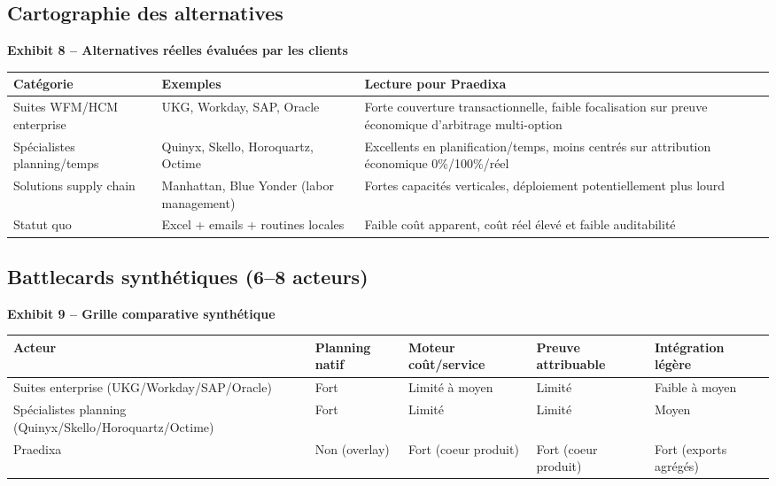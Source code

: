 \documentclass[11pt,a4paper]{article}
\newcommand{\exhibit}[1]{\vspace{2mm}\noindent\colorbox{PraedixaLight}{\parbox{\dimexpr\linewidth-2\fboxsep\relax}{\textbf{#1}}}\vspace{1mm}}
\begin{document}
\subsection{Cartographie des alternatives}
\exhibit{Exhibit 8 -- Alternatives réelles évaluées par les clients}
\begin{tabularx}{\linewidth}{@{}l l X@{}}
\toprule
\textbf{Catégorie} & \textbf{Exemples} & \textbf{Lecture pour Praedixa} \\
\midrule
Suites WFM/HCM enterprise & UKG, Workday, SAP, Oracle & Forte couverture transactionnelle, faible focalisation sur preuve économique d'arbitrage multi-option \\
Spécialistes planning/temps & Quinyx, Skello, Horoquartz, Octime & Excellents en planification/temps, moins centrés sur attribution économique 0\%/100\%/réel \\
Solutions supply chain & Manhattan, Blue Yonder (labor management) & Fortes capacités verticales, déploiement potentiellement plus lourd \\
Statut quo & Excel + emails + routines locales & Faible coût apparent, coût réel élevé et faible auditabilité \\
\bottomrule
\end{tabularx}

\subsection{Battlecards synthétiques (6--8 acteurs)}
\exhibit{Exhibit 9 -- Grille comparative synthétique}
\begin{tabularx}{\linewidth}{@{}Y >{\centering\arraybackslash}p{2.2cm} >{\centering\arraybackslash}p{2.2cm} >{\centering\arraybackslash}p{2.2cm} >{\centering\arraybackslash}p{2.2cm}@{}}
\toprule
\textbf{Acteur} & \textbf{Planning natif} & \textbf{Moteur coût/service} & \textbf{Preuve attribuable} & \textbf{Intégration légère} \\
\midrule
Suites enterprise (UKG/Workday/SAP/Oracle) & Fort & Limité à moyen & Limité & Faible à moyen \\
Spécialistes planning (Quinyx/Skello/Horoquartz/Octime) & Fort & Limité & Limité & Moyen \\
Praedixa & Non (overlay) & Fort (coeur produit) & Fort (coeur produit) & Fort (exports agrégés) \\
\bottomrule
\end{tabularx}
\end{document}
